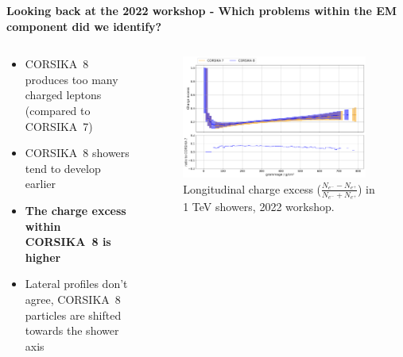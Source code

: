 \documentclass[aspectratio=1610, 9pt]{beamer}
\begin{document}
\begin{frame}

\textbf{Looking back at the 2022 workshop - Which problems within the EM component did we identify?}

    \begin{columns}[onlytextwidth]
        \begin{column}{0.5\textwidth}
            \begin{itemize}
              \item CORSIKA~8 produces too many charged leptons (compared to CORSIKA~7)
              \item CORSIKA~8 showers tend to develop earlier
              \item \textbf{The charge excess within CORSIKA~8 is higher}
              \item Lateral profiles don't agree, CORSIKA~8 particles are shifted towards the shower axis
            \end{itemize}
        \end{column}
        \begin{column}{0.5\textwidth}
            \begin{figure}
                \centering
                \includegraphics[width=0.95\textwidth]{plots/charge_excess_2022.png}
                \caption{Longitudinal charge excess ($\frac{N_{e^-} - N_{e^+}}{N_{e^-} + N_{e^+}}$) in 1 \si{\tera\electronvolt} showers, 2022 workshop.}
            \end{figure}
        \end{column}
    \end{columns}
\end{frame}
\end{document}
